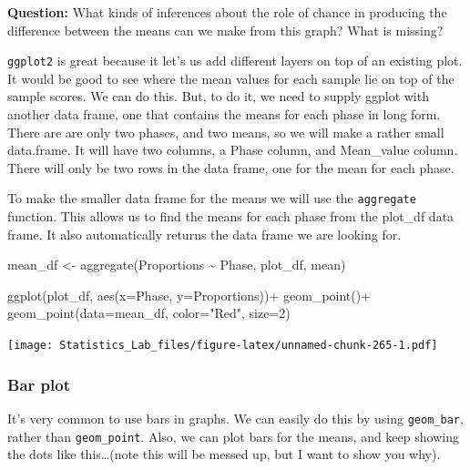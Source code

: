 \documentclass[
]{book}
\newenvironment{Shaded}{\begin{snugshade}}{\end{snugshade}}
\newcommand{\AttributeTok}[1]{\textcolor[rgb]{0.77,0.63,0.00}{#1}}
\newcommand{\DecValTok}[1]{\textcolor[rgb]{0.00,0.00,0.81}{#1}}
\newcommand{\FunctionTok}[1]{\textcolor[rgb]{0.00,0.00,0.00}{#1}}
\newcommand{\NormalTok}[1]{#1}
\newcommand{\OtherTok}[1]{\textcolor[rgb]{0.56,0.35,0.01}{#1}}
\newcommand{\SpecialCharTok}[1]{\textcolor[rgb]{0.00,0.00,0.00}{#1}}
\newcommand{\StringTok}[1]{\textcolor[rgb]{0.31,0.60,0.02}{#1}}
\begin{document}
\textbf{Question:} What kinds of inferences about the role of chance in producing the difference between the means can we make from this graph? What is missing?

\texttt{ggplot2} is great because it let's us add different layers on top of an existing plot. It would be good to see where the mean values for each sample lie on top of the sample scores. We can do this. But, to do it, we need to supply ggplot with another data frame, one that contains the means for each phase in long form. There are are only two phases, and two means, so we will make a rather small data.frame. It will have two columns, a Phase column, and Mean\_value column. There will only be two rows in the data frame, one for the mean for each phase.

To make the smaller data frame for the means we will use the \texttt{aggregate} function. This allows us to find the means for each phase from the plot\_df data frame. It also automatically returns the data frame we are looking for.

\begin{Shaded}
\begin{Highlighting}[]
\NormalTok{mean\_df }\OtherTok{\textless{}{-}} \FunctionTok{aggregate}\NormalTok{(Proportions }\SpecialCharTok{\textasciitilde{}}\NormalTok{ Phase, plot\_df, mean)}

\FunctionTok{ggplot}\NormalTok{(plot\_df, }\FunctionTok{aes}\NormalTok{(}\AttributeTok{x=}\NormalTok{Phase, }\AttributeTok{y=}\NormalTok{Proportions))}\SpecialCharTok{+} 
  \FunctionTok{geom\_point}\NormalTok{()}\SpecialCharTok{+}
  \FunctionTok{geom\_point}\NormalTok{(}\AttributeTok{data=}\NormalTok{mean\_df, }\AttributeTok{color=}\StringTok{"Red"}\NormalTok{, }\AttributeTok{size=}\DecValTok{2}\NormalTok{)}
\end{Highlighting}
\end{Shaded}

\texttt{[image: Statistics\_Lab\_files/figure-latex/unnamed-chunk-265-1.pdf]}

\hypertarget{bar-plot}{%
\subsubsection{Bar plot}\label{bar-plot}}

It's very common to use bars in graphs. We can easily do this by using \texttt{geom\_bar}, rather than \texttt{geom\_point}. Also, we can plot bars for the means, and keep showing the dots like this\ldots(note this will be messed up, but I want to show you why).
\end{document}
